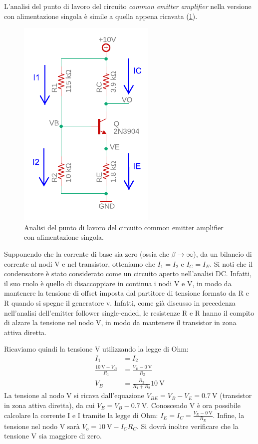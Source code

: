 \noindent
L'analisi del punto di lavoro del circuito \textit{common emitter amplifier} nella versione con alimentazione singola è simile a quella appena ricavata (\Fig\ref{fig:commonemitter_se_DC}).
\begin{figure}[h!]
	\centering
	\includegraphics[width=0.4\linewidth]{./OtherFiles/Laboratorio 3/common emitter_se-punto di lavoro-printout}
	\caption{Analisi del punto di lavoro del circuito common emitter amplifier con alimentazione singola.}
	\label{fig:commonemitter_se_DC}
\end{figure}
Supponendo che la corrente di base sia zero (ossia che $\beta\to\infty$), da un bilancio di corrente al nodi V e nel transistor, otteniamo che $I_1=I_2$ e $I_C=I_E$. Si noti che il condensatore è stato considerato come un circuito aperto nell'analisi DC. Infatti, il suo ruolo è quello di disaccoppiare in continua i nodi V e V, in modo da mantenere la tensione di offset imposta dal partitore di tensione formato da R e R quando si spegne il generatore v. Infatti, come già discusso in precedenza nell'analisi dell'emitter follower single-ended, le resistenze R e R hanno il compito di alzare la tensione nel nodo V, in modo da mantenere il transistor in zona attiva diretta.

\noindent
Ricaviamo quindi la tensione V utilizzando la legge di Ohm:
\begin{equation}
	\begin{split}
		I_1&=I_2 \\
		\frac{\SI{10}{\volt}-V_B}{R_1}&=\frac{V_B-\SI{0}{\volt}}{R_2} \\
		V_B&=\frac{R_2}{R_1+R_2}\SI{10}{\volt}
	\end{split}
\end{equation}
La tensione al nodo V si ricava dall'equazione $V_{BE}=V_B-V_E=\SI{0.7}{\volt}$ (transistor in zona attiva diretta), da cui $V_E=V_B-\SI{0.7}{\volt}$. Conoscendo V è ora possibile calcolare la corrente I e I tramite la legge di Ohm: $I_E=I_C=\frac{V_E-\SI{0}{\volt}}{R_E}$. 
Infine, la tensione nel nodo V sarà $V_o=\SI{10}{\volt}-I_CR_C$. Si dovrà inoltre verificare che la tensione V sia maggiore di zero.

